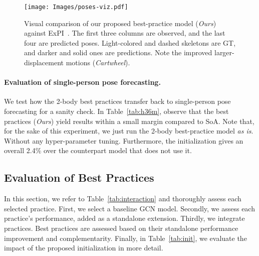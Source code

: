 \documentclass[10pt,twocolumn,letterpaper]{article}
\begin{document}
 
\begin{figure}[htbp]
    \centering
    \texttt{[image: Images/poses-viz.pdf]}

    \caption{Visual comparison of our proposed best-practice  model (\emph{Ours}) against ExPI~\cite{guo21}. The first three columns are observed, and the last four are predicted poses.
    Light-colored and dashed skeletons are GT, and darker and solid ones are predictions. Note the improved larger-displacement motions (\textit{Cartwheel}).
}
     \label{fig:poses-viz}
\end{figure}


\vspace{-.2cm}
\paragraph{Evaluation of single-person pose forecasting.}


We test how the 2-body best practices transfer back to single-person pose forecasting for a sanity check.
In Table~\ref{tab:h36m}, observe that the best practices (\emph{Ours}) yield results within a small margin compared to SoA.
Note that, for the sake of this experiment, we just run the 2-body best-practice model \emph{as is}. Without any hyper-parameter tuning. Furthermore, the initialization gives an overall 2.4$\%$ over the counterpart model that does not use it.

\subsection{Evaluation of Best Practices}\label{sec:best_discussion}

In this section, we refer to Table~\ref{tab:interaction} and thoroughly assess each selected practice. First, we select a baseline GCN model. Secondly, we assess each practice's performance, added as a standalone extension. Thirdly, we integrate practices. Best practices are assessed based on their standalone performance improvement and complementarity. Finally, in Table~\ref{tab:init}, we evaluate the impact of the proposed initialization in more detail.
\end{document}
